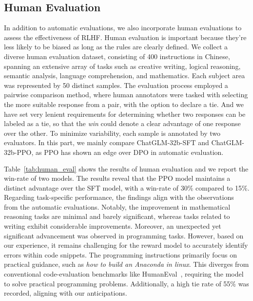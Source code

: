 \subsection{Human Evaluation}
In addition to automatic evaluations, we also incorporate human evaluations to assess the effectiveness of RLHF. Human evaluation is important because they're less likely to be biased as long as the rules are clearly defined. We collect a diverse human evaluation dataset, consisting of 400 instructions in Chinese, spanning an extensive array of tasks such as creative writing, logical reasoning, semantic analysis, language comprehension, and mathematics. Each subject area was represented by 50 distinct samples. 
The evaluation process employed a pairwise comparison method, where human annotators were tasked with selecting the more suitable response from a pair, with the option to declare a tie. And we have set very lenient requirements for determining whether two responses can be labeled as a tie, so that the \textit{win} could denote a clear advantage of one response over the other.
To minimize variability, each sample is annotated by two evaluators. In this part, we mainly compare ChatGLM-32b-SFT and ChatGLM-32b-PPO, as PPO has shown an edge over DPO in automatic evaluation.

 Table~\ref{tab:human_eval} shows the results of human evaluation and we report the win-rate of two models. The results reveal that the PPO model maintains a distinct advantage over the SFT model, with a win-rate of 30\% compared to 15\%. Regarding task-specific performance, the findings align with the observations from the automatic evaluations. Notably, the improvement in mathematical reasoning tasks are minimal and barely significant, whereas tasks related to writing exhibit considerable improvements. Moreover, an unexpected yet significant advancement was observed in programming tasks. However, based on our experience, it remains challenging for the reward model to accurately identify errors within code snippets. The programming instructions primarily focus on practical guidance, such as \textit{how to build an Anaconda in linux}. This diverges from conventional code-evaluation benchmarks like HumanEval~\cite{chen2021evaluating}, requiring the model to solve practical programming problems. Additionally, a high tie rate of 55\% was recorded, aligning with our anticipations.


